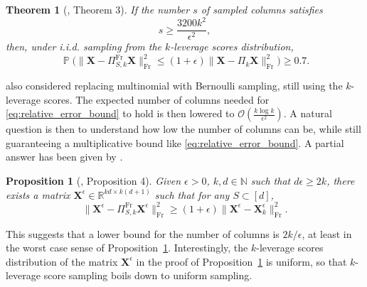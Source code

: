 \documentclass[twoside,11pt]{book}
\newtheorem{theorem}{Theorem}
\newtheorem{proposition}{Proposition}
\numberwithin{theorem}{chapter}
\numberwithin{definition}{chapter}
\numberwithin{proposition}{chapter}
\numberwithin{corollary}{chapter}
\numberwithin{example}{chapter}
\numberwithin{lemma}{chapter}
\numberwithin{assumption}{chapter}
\numberwithin{equation}{chapter}
\numberwithin{figure}{chapter}
\DeclareMathOperator{\Fr}{\mathrm{Fr}}
\DeclareMathOperator{\EX}{\mathbb{E}}
\DeclareMathOperator{\Prb}{\mathbb{P}}
\newcommand{\pc}[1]{\textcolor{blue}{#1}}
\begin{document}
\begin{theorem}[\citealp{DrMaMu07}, Theorem 3]
If the number $s$ of sampled columns satisfies
\begin{equation}
s \geq \frac{3200 k^{2}}{\epsilon^{2}},
\end{equation}
then, under i.i.d. sampling from the $k$-leverage scores distribution,
\begin{equation}\label{eq:relative_error_bound}
    \Prb \bigg( \| \bm{X} - \Pi_{S,k}^{\Fr}\bm{X}\|_{\Fr}^{2} \leq (1 + \epsilon) \| \bm{X} - \Pi_{k}\bm{X}\|_{\Fr}^{2} \bigg) \geq 0.7 .
\end{equation}
\end{theorem}
\citet{DrMaMu07} also considered replacing multinomial with Bernoulli sampling, still using the $k$-leverage scores. The expected number of columns needed for \eqref{eq:relative_error_bound} to hold is then lowered to $\mathcal{O}(\frac{k \log k}{\epsilon^{2}})$. A natural question is then to understand how low the number of columns can be, while still guaranteeing a multiplicative bound like \eqref{eq:relative_error_bound}. A partial answer has been given by \cite{DeVe06}.
\begin{proposition}[\citealp{DeVe06}, Proposition 4]\label{prop:lower_bound_cssp}
Given $\epsilon > 0$, $k,d \in \mathbb{N}$ such that $d \epsilon \geq 2k$, there exists a matrix $\bm{X}^{\epsilon} \in \mathbb{R}^{kd \times k(d+1)}$ such that for any $S \subset [d]$,
\begin{equation}
\| \bm{X}^{\epsilon} - \Pi_{S,k}^{\Fr} \bm{X}^{\epsilon} \|_{\Fr}^{2} \geq (1+\epsilon) \| \bm{X}^{\epsilon} - \bm{X}^{\epsilon}_{k} \|_{\Fr}^{2}.
\end{equation}
\end{proposition}
This suggests that a lower bound for the number of columns is $2k/\epsilon$, at least in the worst case sense of Proposition~\ref{prop:lower_bound_cssp}. Interestingly, the $k$-leverage scores distribution of the matrix $\bm{X}^{\epsilon}$ in the proof of Proposition~\ref{prop:lower_bound_cssp} is uniform, so that $k$-leverage score sampling boils down to uniform sampling.

\end{document}
